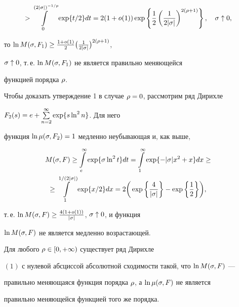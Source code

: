 \begin{pf}
\begin{multline*}
>\int\limits_{0}^{(2|\s|)^{-1/p}}\exp\{t/2\}dt=


2(1+o(1))\exp\left\{\frac12\left(\frac{1}{2|\s|}\right)^{2(\r+1)}\right\},


\quad \s\uparrow 0,


\end{multline*}


то $\ln M(\sigma,F_1)\ge\frac{1+o(1)}2\big(\frac{1}{2|\sigma|}\big)^{2(\rho+1)}$,


$\sigma\uparrow 0$, т.\,е. $\ln M(\sigma,F_1)$ не является правильно меняющейся 


функцией порядка $\rho$.





Чтобы доказать утверждение 1 в случае $\rho=0$, рассмотрим ряд Дирихле


$F_2(s)= e+\sum\limits_{n=2}^{\infty}\exp\{s\ln^2 n\}$. Для него


функция $\ln \mu(\sigma,F_2)=1$ медленно неубывающая и, как выше,


\begin{multline*}


M(\s,F)\ge\int\limits_{e}^{\i}\exp\{\s\ln^2 t\}dt=


\int\limits_{1}^{\i}\exp\{-|\s|x^2+x\}dx\ge\\


\ge\int\limits_{1}^{1/(2|\s|)}\exp\{x/2\}dx=


2\bigg(\exp\bigg\{\frac{4}{|\s|}\bigg\}-


\exp\bigg\{\frac12\bigg\}\bigg),


\end{multline*}


т.\,е. $\ln M(\sigma,F)\ge \frac{4(1+o(1))}{|\sigma|}$, $\sigma\uparrow 0$, и функция 


$\ln M(\sigma,F)$ не является медленно возрастающей.


\end{pf}





\begin{assrt}


Для любого $\rho\in[0,+\infty)$ существует ряд Дирихле


$(1)$ с нулевой абсциссой абсолютной сходимости такой, что $\ln M(\sigma,F)$ --- 


правильно меняющаяся функция порядка $\rho$, а $\ln \mu(\sigma,F)$ не является


правильно меняющейся функцией того же порядка.


\end{assrt}





